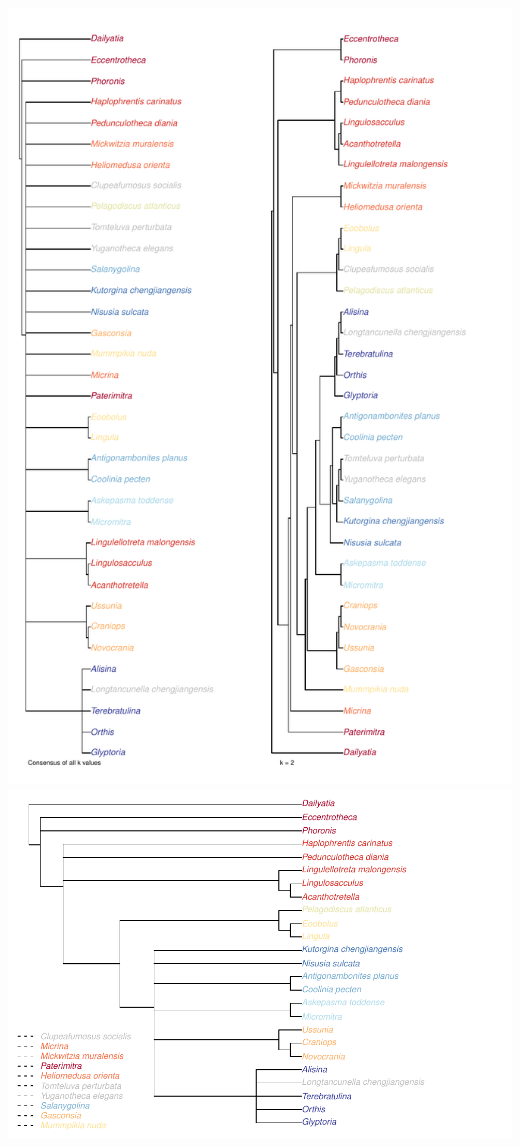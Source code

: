 \documentclass[]{book}
\theoremstyle{definition}
\theoremstyle{definition}
\theoremstyle{definition}
\theoremstyle{remark}
\begin{document}
\includegraphics{Brachiopod_phylogeny_files/figure-latex/unnamed-chunk-6-1.pdf}
\includegraphics{Brachiopod_phylogeny_files/figure-latex/unnamed-chunk-7-1.pdf}
\end{document}
